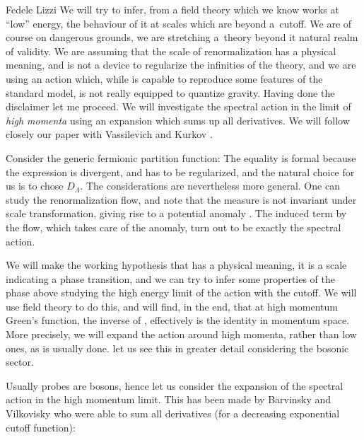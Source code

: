\begin{artengenv}{Fedele Lizzi}
We will try to infer, from a field theory which we know works at ``low'' energy, the behaviour of it at scales which are beyond a~cutoff. We are of course on dangerous grounds, we are stretching a~theory beyond it natural realm of validity. We are assuming that the scale of renormalization has a physical meaning, and is not a device to regularize the infinities of the theory, and we are using an action which, while is capable to reproduce some features of the standard model, is not really equipped to quantize gravity.
Having done the disclaimer let me proceed. We will investigate the spectral action in the limit of \emph{high momenta} using an expansion which sums up all derivatives. We will follow closely our paper with Vassilevich and Kurkov \parencite*{Kuliva}.

Consider the generic fermionic partition function:
 The equality is formal because the expression is divergent, and has to be regularized, and the natural choice for us is to chose $D_\Lambda$. The considerations are nevertheless more general. One can study the renormalization flow, and note that the measure is not invariant under scale transformation, giving rise to a potential anomaly \parencite{Andrianov:2010nr, Andrianov:2011bc}.
The induced term by the flow, which takes care of the anomaly, turn out to be exactly the spectral action.

We will make the working hypothesis that \formu{\Lambda} has a physical meaning, it is a scale indicating a phase transition, and we can try to infer some properties of the phase above \formu{\Lambda} studying the high energy limit of the action with the cutoff. We will use field theory to do this, and will find, in the end, that at high momentum Green's function, the inverse of , effectively is the identity in momentum space. More precisely, we will expand the action around high momenta, rather than low ones, as is usually done. let us see this in greater detail considering the bosonic sector.



Usually probes are bosons, hence let us consider the expansion of the spectral action in the high momentum limit.
This has been made by Barvinsky and Vilkovisky \parencite*{Barvinsky:1990up} who were able to sum all derivatives (for a decreasing exponential cutoff function):


\end{artengenv}
